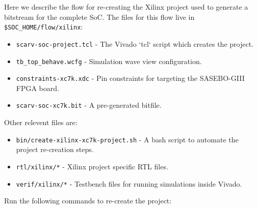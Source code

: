 
Here we describe the flow for re-creating the Xilinx project used to generate
a bitstream for the complete SoC.
The files for this flow live in {\tt \$SOC\_HOME/flow/xilinx}:

\begin{itemize}
\item {\tt scarv-soc-project.tcl} - The Vivado `tcl` script which creates 
    the project.

\item {\tt tb\_top\_behave.wcfg} - Simulation wave view configuration.

\item {\tt constraints-xc7k.xdc} - Pin constraints for targeting the
    SASEBO-GIII FPGA board.

\item {\tt scarv-soc-xc7k.bit} - A pre-generated bitfile.
\end{itemize}

\noindent Other relevent files are:

\begin{itemize}
\item {\tt bin/create-xilinx-xc7k-project.sh} - A bash script to automate the
    project re-creation steps.

\item {\tt rtl/xilinx/*} - Xilinx project specific RTL files.

\item {\tt verif/xilinx/*} - Testbench files for running simulations inside
Vivado.
\end{itemize}


\noindent Run the following commands to re-create the project:

